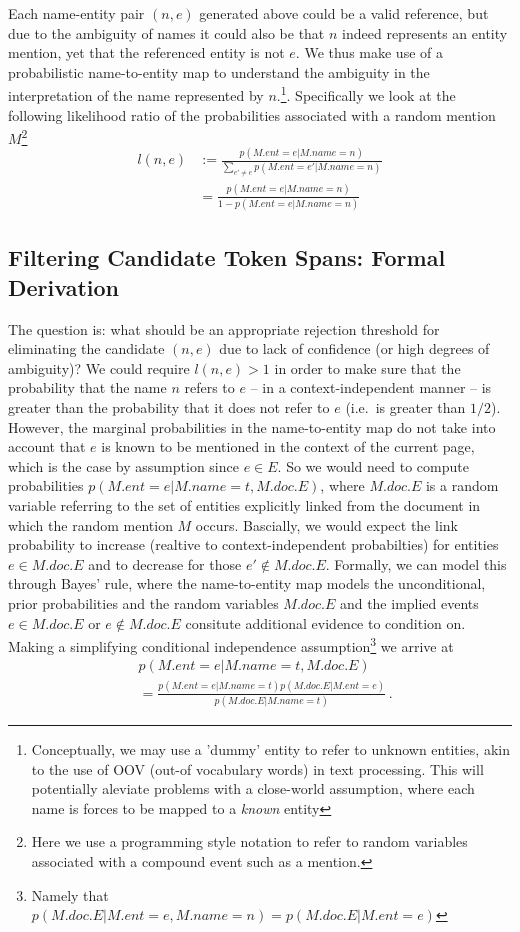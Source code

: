 \documentclass{article}
\begin{document}
Each name-entity pair $(n,e)$ generated above could be a valid reference, but due to the ambiguity of names it could also be that $n$ indeed represents an entity mention, yet that the referenced entity is not $e$. We thus make use of a probabilistic name-to-entity map to understand the ambiguity in the interpretation of the name represented by $n$.\footnote{Conceptually, we may use a 'dummy' entity to refer to unknown entities, akin to the use of OOV (out-of vocabulary words) in text processing. This will potentially aleviate problems with a close-world assumption, where each name is forces to be mapped  to a {\it known} entity}. Specifically we look at the following likelihood ratio of the probabilities associated with a random mention $M$\footnote{Here we use a programming style notation to refer to random variables associated with a compound event such as a mention.}
\begin{align}
l(n,e) & := \frac{p(M.ent = e | M.name = n)}{\sum_{e' \neq e} p(M.ent = e' | M.name = n)}
\\ & = \frac{p(M.ent = e | M.name = n)}{1-p(M.ent = e | M.name = n)} \nonumber
\end{align}

\subsection*{Filtering Candidate Token Spans: Formal Derivation} 

The question is: what should be an appropriate rejection threshold for eliminating the candidate $(n,e)$ due to lack of confidence (or high degrees of ambiguity)?  We could require $l(n,e) > 1$ in order to make sure that the probability that the name $n$ refers to $e$ -- in a context-independent manner -- is greater than the probability that it does not refer to $e$ (i.e.~is greater than $1/2$). \\

However, the marginal probabilities in the name-to-entity map do not take into account that $e$ is known to be mentioned in the context of the current page, which is the case by assumption since $e \in E$. So we would need to compute probabilities $p(M.ent =e | M.name=t, M.doc.E)$, where $M.doc.E$ is a random variable referring to the set of entities explicitly linked from the document in which the random mention $M$ occurs. Bascially, we would expect the link probability to increase (realtive to context-independent probabilties) for entities $e \in M.doc.E$ and to decrease for those $e' \not\in M.doc.E$. Formally, we can model this through Bayes' rule, where the name-to-entity map models the unconditional, prior probabilities and the random variables $M.doc.E$ and the implied events $e \in M.doc.E$ or $e \not\in M.doc.E$ consitute additional evidence to condition on. Making a simplifying conditional independence assumption\footnote{Namely that  $ p(M.doc.E | M.ent=e, M.name=n) =  p(M.doc.E | M.ent=e)$} we arrive at 
\begin{align}
& p(M.ent =e | M.name=t, M.doc.E)  \\
& = \frac{ p(M.ent =e | M.name=t) p(M.doc.E | M.ent=e)}{p(M.doc.E | M.name=t)} \,. \nonumber
\end{align}
\end{document}

